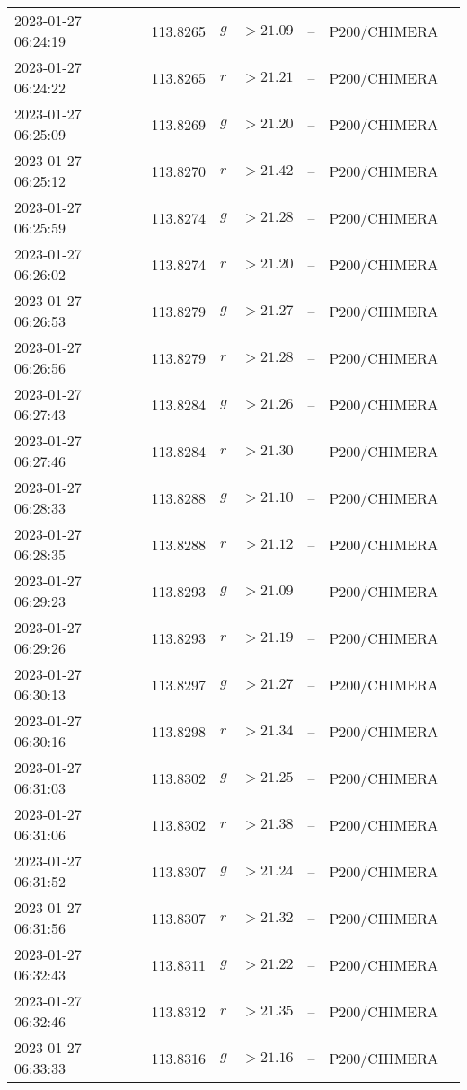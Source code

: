 \documentclass{nature_plusfigure}
\begin{document}
\begin{supplement}
\begin{center}
\begin{longtable}{lllllll}
2023-01-27 06:24:19 & 113.8265 & $g$ & $>21.09$ & -- & P200/CHIMERA &  \\ 
2023-01-27 06:24:22 & 113.8265 & $r$ & $>21.21$ & -- & P200/CHIMERA &  \\ 
2023-01-27 06:25:09 & 113.8269 & $g$ & $>21.20$ & -- & P200/CHIMERA &  \\ 
2023-01-27 06:25:12 & 113.8270 & $r$ & $>21.42$ & -- & P200/CHIMERA &  \\ 
2023-01-27 06:25:59 & 113.8274 & $g$ & $>21.28$ & -- & P200/CHIMERA &  \\ 
2023-01-27 06:26:02 & 113.8274 & $r$ & $>21.20$ & -- & P200/CHIMERA &  \\ 
2023-01-27 06:26:53 & 113.8279 & $g$ & $>21.27$ & -- & P200/CHIMERA &  \\ 
2023-01-27 06:26:56 & 113.8279 & $r$ & $>21.28$ & -- & P200/CHIMERA &  \\ 
2023-01-27 06:27:43 & 113.8284 & $g$ & $>21.26$ & -- & P200/CHIMERA &  \\ 
2023-01-27 06:27:46 & 113.8284 & $r$ & $>21.30$ & -- & P200/CHIMERA &  \\ 
2023-01-27 06:28:33 & 113.8288 & $g$ & $>21.10$ & -- & P200/CHIMERA &  \\ 
2023-01-27 06:28:35 & 113.8288 & $r$ & $>21.12$ & -- & P200/CHIMERA &  \\ 
2023-01-27 06:29:23 & 113.8293 & $g$ & $>21.09$ & -- & P200/CHIMERA &  \\ 
2023-01-27 06:29:26 & 113.8293 & $r$ & $>21.19$ & -- & P200/CHIMERA &  \\ 
2023-01-27 06:30:13 & 113.8297 & $g$ & $>21.27$ & -- & P200/CHIMERA &  \\ 
2023-01-27 06:30:16 & 113.8298 & $r$ & $>21.34$ & -- & P200/CHIMERA &  \\ 
2023-01-27 06:31:03 & 113.8302 & $g$ & $>21.25$ & -- & P200/CHIMERA &  \\ 
2023-01-27 06:31:06 & 113.8302 & $r$ & $>21.38$ & -- & P200/CHIMERA &  \\ 
2023-01-27 06:31:52 & 113.8307 & $g$ & $>21.24$ & -- & P200/CHIMERA &  \\ 
2023-01-27 06:31:56 & 113.8307 & $r$ & $>21.32$ & -- & P200/CHIMERA &  \\ 
2023-01-27 06:32:43 & 113.8311 & $g$ & $>21.22$ & -- & P200/CHIMERA &  \\ 
2023-01-27 06:32:46 & 113.8312 & $r$ & $>21.35$ & -- & P200/CHIMERA &  \\ 
2023-01-27 06:33:33 & 113.8316 & $g$ & $>21.16$ & -- & P200/CHIMERA &  \\ 

\end{longtable}
\end{center}
\end{supplement}
\end{document}
